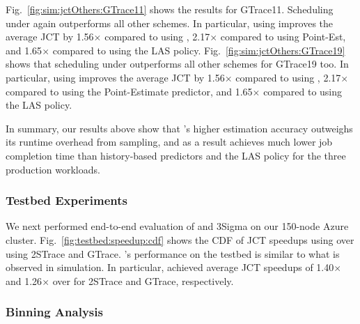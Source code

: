 Fig.~\ref{fig:sim:jctOthers:GTrace11} shows the results for GTrace11.  
Scheduling under \slearn again outperforms all other schemes. In particular,
using \slearn improves the average JCT by 1.56$\times$ compared to using
\primarybasepredict, 2.17$\times$ compared to using Point-Est,
and 1.65$\times$ compared to using the LAS policy.
Fig.~\ref{fig:sim:jctOthers:GTrace19} shows that
scheduling under \slearn outperforms all other schemes for GTrace19 too.
In particular, using \slearn improves
the average JCT by 1.56$\times$ compared to using \primarybasepredict,
2.17$\times$ compared to using the Point-Estimate predictor, and 1.65$\times$
compared to using the LAS policy.

In summary, our results above show that \slearn's higher estimation accuracy
outweighs its runtime overhead from sampling, and as a result achieves much
lower job completion time than history-based predictors and the LAS policy for
the three production workloads.

\fi


\subsubsection{Testbed Experiments}
We next performed end-to-end evaluation of \slearn and 3Sigma on our 150-node
Azure cluster.  Fig.~\ref{fig:testbed:speedup:cdf} shows the CDF of JCT
speedups using \slearn over \primarybasepredict using 2STrace and GTrace.
\slearn's performance on the testbed is similar to what is observed in
simulation.  In particular, \slearn achieved {average} JCT speedups of
1.40$\times$ and 1.26$\times$ over \primarybase for 2STrace and GTrace,
respectively.

\subsubsection{Binning Analysis}
\label{sec:sim:binning}

